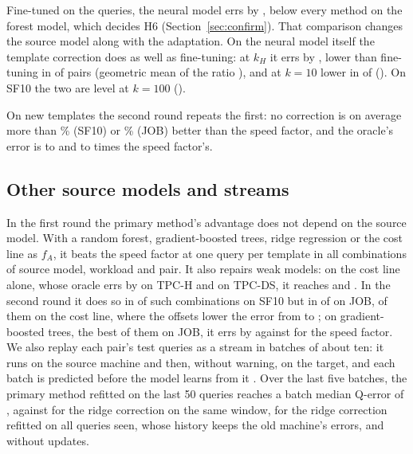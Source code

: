 \documentclass[conference]{IEEEtran}
\begin{document}
Fine-tuned on the \XJobKH{} queries, the neural model errs by
\XJobKHNnFull, below every method on the forest model, which decides H6
(Section~\ref{sec:confirm}). That comparison changes the source model along
with the adaptation. On the neural model itself the template correction
does as well as fine-tuning: at $k_H$ it errs by
\NNExtJobRrNnTplKThreeThree, lower than fine-tuning in
\XeJobNnTplBelowFullKH{} of \XJobPairs{} pairs (geometric mean of the ratio
\XeJobNnTplOverFullKH), and at $k=10$ lower in \XeJobNnTplBelowFullKOneZero{}
of \XJobPairs{} (\XeJobNnTplOverFullKOneZero). On SF10 the two are level at
$k=100$ (\XeTpchTenNnTplOverFullKH).

On new templates the second round repeats the first: no correction is on
average more than \XcNewTpchTenHardBestPct\% (SF10) or
\XcNewJobHardBestPct\% (JOB) better than the speed factor, and the oracle's
error is \XcNewTpchTenHardOracleMin{} to \XcNewTpchTenHardOracleMax{} and
\XcNewJobHardOracleMin{} to \XcNewJobHardOracleMax{} times the speed
factor's.

\subsection{Other source models and streams}
\label{sec:sources}

In the first round the primary method's advantage does not depend on the
source model. With a random forest, gradient-boosted trees, ridge
regression or the cost line as $f_A$, it beats the speed factor at one
query per template in all \SrcWinsTotal{} combinations of source model,
workload and pair. It also repairs weak models: on the cost line alone,
whose oracle errs by \SrcTpchCostOracle{} on TPC-H and \SrcTpcdsCostOracle{}
on TPC-DS, it reaches \SrcTpchCostPrimary{} and \SrcTpcdsCostPrimary. In the
second round it does so in \XeSrcTpchTenOtherWins{} of
\XeSrcTpchTenOtherPairs{} such combinations on SF10 but in
\XeSrcJobOtherWins{} of \XeSrcJobOtherPairs{} on JOB, \XeSrcJobCostWins{} of
them on the cost line, where the offsets lower the error from
\XeSrcJobCostSpeed{} to \XeSrcJobCostPrimary; on gradient-boosted trees, the
best of them on JOB, it errs by \XeSrcJobBoostingPrimary{} against
\XeSrcJobBoostingSpeed{} for the speed factor. We also replay each
pair's test queries as a stream in batches of about ten: it runs on the
source machine and then, without warning, on the target, and each batch is
predicted before the model learns from it \cite{gama2013}. Over the last five
batches, the primary method refitted on the last 50 queries reaches a batch
median Q-error of \StreamFinalLowdimTemplateLastFiveZero{}, against
\StreamFinalRidgeLastFiveZero{} for the ridge correction on the same window,
\StreamFinalRidgeAll{} for the ridge correction refitted on all queries
seen, whose history keeps the old machine's errors, and \StreamFinalNever{}
without updates.
\end{document}
